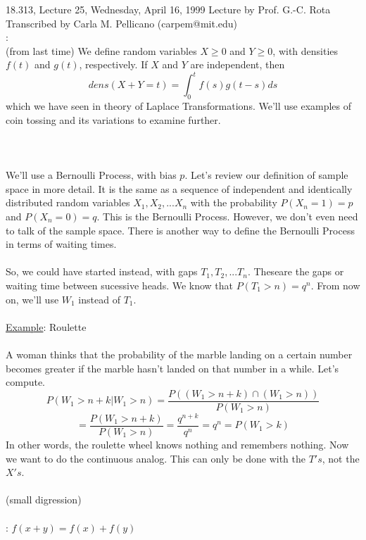 {\Large 18.313, Lecture 25, Wednesday, April 16, 1999}\newline
{\large Lecture by Prof. G.-C. Rota}\\
Transcribed by Carla M. Pellicano (carpem@mit.edu)\\

:\\

\noindent (from last time)  We define random variables $X\geq 0$ and $Y\geq 0$, with densities $f(t)$ and  $g(t)$, respectively.  If $X$ and $Y$ are independent, then 
$$dens(X+Y=t)=\int_0^t f(s)g(t-s)ds$$
which we have seen in theory of Laplace Transformations.  We'll use examples of coin tossing and its variations to examine further.\\\\
\\\\
We'll use a Bernoulli Process, with bias $p$.  Let's review our definition of sample space in more detail.  It is the same as a sequence of independent and identically distributed random variables $X_1,X_2,...X_n$ with the probability $P(X_n=1)=p$ and $P(X_n=0)=q$.  This is the Bernoulli Process.  However, we don't even need to talk of the sample space.  There is another way to define the Bernoulli Process in terms of waiting times.\\\\
\noindent So, we could have started instead, with gaps $T_1,T_2,...T_n$.  Theseare the gaps or waiting time between sucessive heads.  We know that $P(T_1>n)=q^n$.  From now on, we'll use $W_1$ instead of $T_1$.  \\\\
\noindent\underline{Example}:  Roulette\\\\
A woman thinks that the probability of the marble landing on a certain number becomes greater if the marble hasn't landed on that number in a while.  Let's compute.
$$P(W_1>n+k|W_1>n)=\frac{P((W_1>n+k)\cap(W_1>n))}{P(W_1>n)}$$
$$=\frac{P(W_1>n+k)}{P(W_1>n)}=\frac{q^{n+k}}{q^n}=q^n=P(W_1>k)$$
In other words, the roulette wheel knows nothing and remembers nothing.  Now we want to do the continuous analog.  This can only be done with the $T's$, not the $X's$.\\\\
\noindent (small digression)\\\\
:  $f(x+y)=f(x)+f(y)$\\\\
